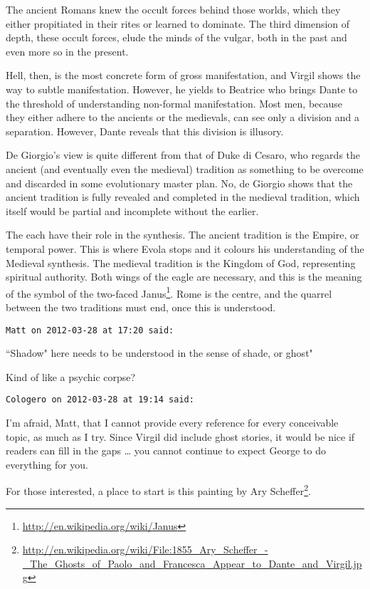 \begin{footnotesize}
\begin{sffamily}
The ancient Romans knew the occult forces behind those worlds, which they either propitiated in their rites or learned to dominate. The third dimension of depth, these occult forces, elude the minds of the vulgar, both in the past and even more so in the present.

Hell, then, is the most concrete form of gross manifestation, and Virgil shows the way to subtle manifestation. However, he yields to Beatrice who brings Dante to the threshold of understanding non-formal manifestation. Most men, because they either adhere to the ancients or the medievals, can see only a division and a separation. However, Dante reveals that this division is illusory.

De Giorgio's view is quite different from that of Duke di Cesaro, who regards the ancient (and eventually even the medieval) tradition as something to be overcome and discarded in some evolutionary master plan. No, de Giorgio shows that the ancient tradition is fully revealed and completed in the medieval tradition, which itself would be partial and incomplete without the earlier.

The each have their role in the synthesis. The ancient tradition is the Empire, or temporal power. This is where Evola stops and it colours his understanding of the Medieval synthesis. The medieval tradition is the Kingdom of God, representing spiritual authority. Both wings of the eagle are necessary, and this is the meaning of the symbol of the two-faced Janus\footnote{\url{http://en.wikipedia.org/wiki/Janus}}. Rome is the centre, and the quarrel between the two traditions must end, once this is understood.


\hfill

\texttt{Matt on 2012-03-28 at 17:20 said: }

``Shadow" here needs to be understood in the sense of shade, or ghost"

Kind of like a psychic corpse?


\hfill

\texttt{Cologero on 2012-03-28 at 19:14 said: }

I'm afraid, Matt, that I cannot provide every reference for every conceivable topic, as much as I try. Since Virgil did include ghost stories, it would be nice if readers can fill in the gaps … you cannot continue to expect George to do everything for you.

For those interested, a place to start is this painting by Ary Scheffer\footnote{\url{http://en.wikipedia.org/wiki/File:1855_Ary_Scheffer_-_The_Ghosts_of_Paolo_and_Francesca_Appear_to_Dante_and_Virgil.jpg}}.



\end{sffamily}
\end{footnotesize}
